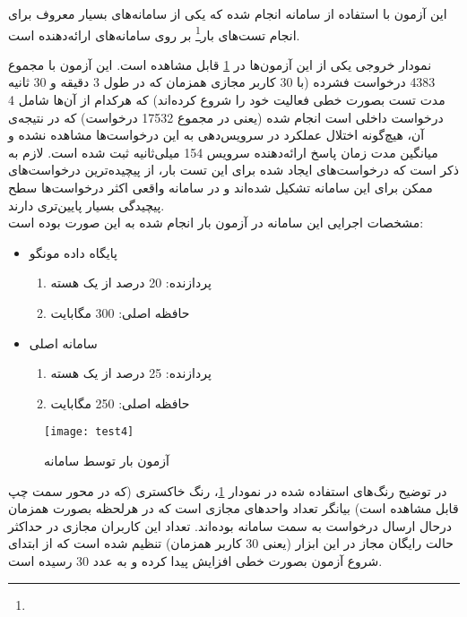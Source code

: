 
این آزمون با استفاده از سامانه \cite{k6} انجام شده که یکی از سامانه‌های بسیار معروف برای انجام تست‌های بار\footnote{} بر روی سامانه‌های ارائه‌دهنده  است.

نمودار خروجی یکی از این آزمون‌ها در \cref{fig:test4} قابل مشاهده است. این آزمون با مجموع 4383 درخواست فشرده (با 30 کاربر مجازی همزمان که در طول 3 دقیقه و 30 ثانیه مدت تست بصورت خطی فعالیت خود را شروع کرده‌اند) که هرکدام از آن‌ها شامل 4 درخواست داخلی است انجام شده (یعنی در مجموع 17532 درخواست) که در نتیجه‌ی آن، هیچ‌گونه اختلال عملکرد در سرویس‌دهی به این درخواست‌ها مشاهده نشده و میانگین مدت زمان پاسخ ارائه‌دهنده سرویس 154 میلی‌ثانیه ثبت شده است. لازم به ذکر است که درخواست‌های ایجاد شده برای این تست بار، از پیچیده‌ترین درخواست‌های ممکن برای این سامانه تشکیل شده‌اند و در سامانه واقعی اکثر درخواست‌ها سطح پیچیدگی بسیار پایین‌تری دارند.\\

مشخصات اجرایی این سامانه در آزمون بار انجام شده به این صورت بوده است:
\begin{itemize}
	\item پایگاه داده مونگو
	\begin{enumerate}
		\item پردازنده: 20 درصد از یک هسته
		\item حافظه اصلی: 300 مگابایت
	\end{enumerate}
	\item سامانه اصلی
	\begin{enumerate}
		\item پردازنده: 25 درصد از یک هسته
		\item حافظه اصلی: 250 مگابایت
	\end{enumerate}
\end{itemize}

\begin{figure}[H]
	\centering
	\texttt{[image: test4]}
	\caption{آزمون بار توسط سامانه }
	\label{fig:test4}
\end{figure}

در توضیح رنگ‌های استفاده شده در نمودار \cref{fig:test4}، رنگ خاکستری (که در محور سمت چپ قابل مشاهده است) بیانگر تعداد واحدهای مجازی است که در هرلحظه بصورت همزمان درحال ارسال درخواست به سمت سامانه بوده‌اند. تعداد این کاربران مجازی در حداکثر حالت رایگان مجاز در این ابزار‌ (یعنی 30 کاربر همزمان) تنظیم شده است که از ابتدای شروع آزمون بصورت خطی افزایش پیدا کرده و به عدد 30 رسیده است.

